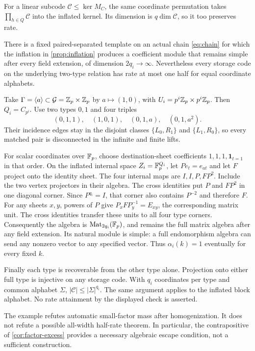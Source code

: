 For a linear subcode $\mathcal C\le\ker M_C$, the same coordinate
permutation takes $\prod_{h\in Q}\mathcal C$ into the inflated
kernel. Its dimension is $q\dim\mathcal C$, so it too preserves rate.

\begin{proposition}
\label{prop:large-factor}
\notformalized
There is a fixed paired-separated template on an actual chain
\eqref{eq:chain} for which the inflation in \cref{prop:inflation}
produces a coefficient module that remains simple after every field
extension, of dimension $2q_i\to\infty$.
Nevertheless every storage code on the underlying two-type relation
has rate at most one half for equal coordinate alphabets.
\end{proposition}
\begin{informalproof}
Take $\Gamma=\langle a\rangle\subset\mathcal G=\mathbb{Z}_p\times\mathbb{Z}_p$
by $a\mapsto(1,0)$, with $U_i=p^i\mathbb{Z}_p\times p^i\mathbb{Z}_p$.
Then $Q_i=C_{p^i}$. Use two types $0,1$ and four triples
\[
 (0,1,1),\quad(1,0,1),\quad(0,1,a),\quad(0,1,a^2).
\]
Their incidence edges stay in the disjoint classes
$\{L_0,R_1\}$ and $\{L_1,R_0\}$, so every matched pair is
disconnected in the infinite and finite lifts.

For scalar coordinates over $\mathbb{F}_p$, choose destination-sheet
coefficients $1,1,1,\mathbf1_{t=1}$ in that order. On the inflated
internal space $Z_i=\mathbb{F}_p^{Q_i}$, let $P e_t=e_{at}$ and let $F$
project onto the identity sheet. The four internal maps are
$I,I,P,FP^2$. Include the two vertex projectors in their algebra.
The cross identities put $P$ and $FP^2$ in one diagonal corner.
Since $P^{q_i}=I$, that corner also contains $P^{-2}$ and therefore
$F$. For any sheets $x,y$, powers of $P$ give
$P_xFP_y^{-1}=E_{xy}$, the corresponding matrix unit.
The cross identities transfer these units to all four type corners.
Consequently the algebra is
$\operatorname{Mat}_{2q_i}(\mathbb{F}_p)$, and remains the full matrix
algebra after any field extension. Its natural module is simple:
a full endomorphism algebra can send any nonzero vector to any
specified vector. Thus $\alpha_i(k)=1$ eventually for every fixed $k$.

Finally each type is recoverable from the other type alone.
Projection onto either full type is injective on any storage code.
With $q_i$ coordinates per type and common alphabet $\Sigma$,
$|\mathcal C|\le|\Sigma|^{q_i}$. The same argument applies to the
inflated block alphabet. No rate attainment by the displayed check
is asserted.
\end{informalproof}

The example refutes automatic small-factor mass after homogenization.
It does not refute a possible all-width half-rate theorem. In
particular, the contrapositive of \cref{cor:factor-excess} provides
a necessary algebraic escape condition, not a sufficient construction.
